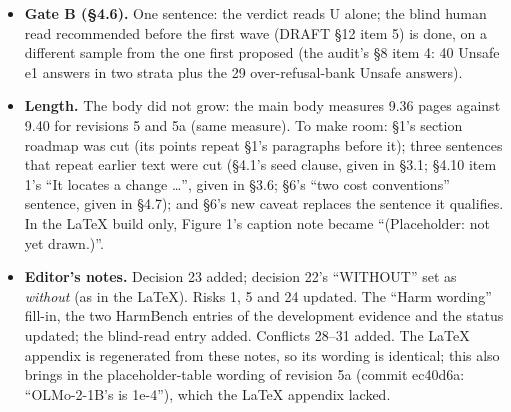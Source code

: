 \documentclass{article}
\theoremstyle{plain}
\theoremstyle{definition}
\theoremstyle{remark}
\begin{document}
\begin{itemize}
\begin{itemize}
          \S{}3.6 ``sampled harm answers'' $\to$ ``sampled answers to harm
          prompts''.
    \item \textbf{Searched and left, because they make no harm claim:} dataset,
          benchmark and category names (HarmBench, the harm bank, harm prompts,
          ``harmful requests'', ``harmful anchors'' and ``benign prompts that
          resemble harmful ones'', the hard-category list, PKU-SafeRLHF's and
          the plant's source labels); prior work's own measures (\S{}1, \S{}2);
          ``safety'' as the field's name for the outcome and in reference names
          (the title, ``restores the most safety'', Gate B's question, the
          figure caption, $\Lambda_m$'s gloss, ``safety prompt'', Safe LoRA,
          ``safety data''); and the three sentences of the \emph{worse} label
          that use ``harmful'' for the adverse direction of a contrast (\S{}1,
          \S{}3.2, \S{}4.3 P4; the user's wording of 8 Oct 18:31 UTC). Decision
          23 lists these for the user.
  \end{itemize}
  \item \textbf{Gate B (\S{}4.6).} One sentence: the verdict reads U alone; the
        blind human read recommended before the first wave (DRAFT \S{}12 item 5)
        is done, on a different sample from the one first proposed (the audit's
        \S{}8 item 4: 40 Unsafe e1 answers in two strata plus the 29
        over-refusal-bank Unsafe answers).
  \item \textbf{Length.} The body did not grow: the main body measures 9.36
        pages against 9.40 for revisions 5 and 5a (same measure). To make room:
        \S{}1's section roadmap was cut (its points repeat \S{}1's paragraphs
        before it); three sentences that repeat earlier text were cut (\S{}4.1's
        seed clause, given in \S{}3.1; \S{}4.10 item 1's ``It locates a change
        \ldots{}'', given in \S{}3.6; \S{}6's ``two cost conventions'' sentence,
        given in \S{}4.7); and \S{}6's new caveat replaces the sentence it
        qualifies. In the LaTeX build only, Figure 1's caption note became
        ``(Placeholder: not yet drawn.)''.
  \item \textbf{Editor's notes.} Decision 23 added; decision 22's ``WITHOUT''
        set as \emph{without} (as in the LaTeX). Risks 1, 5 and 24 updated. The
        ``Harm wording'' fill-in, the two HarmBench entries of the development
        evidence and the status updated; the blind-read entry added. Conflicts
        28--31 added. The LaTeX appendix is regenerated from these notes, so its
        wording is identical; this also brings in the placeholder-table wording
        of revision 5a (commit ec40d6a: ``OLMo-2-1B's is 1e-4''), which the
        LaTeX appendix lacked.
\end{itemize}
\end{document}
